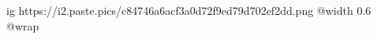  
 
 
 
 

\ifcmt
  ig https://i2.paste.pics/c84746a6acf3a0d72f9ed79d702ef2dd.png
  @width 0.6
  @wrap 
\fi
